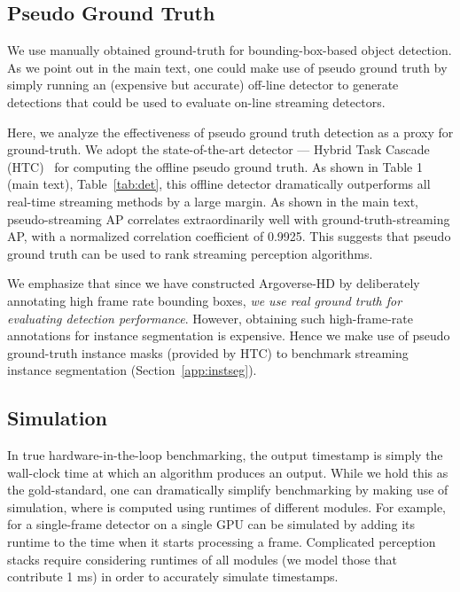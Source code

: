 \subsection{Pseudo Ground Truth}
\label{app:pseudo-gt}
We use manually obtained ground-truth for bounding-box-based object detection. As we point out in the main text, one could make use of pseudo ground truth by simply running an (expensive but accurate) off-line detector to generate detections that could be used to evaluate on-line streaming detectors.

Here, we analyze the effectiveness of pseudo ground truth detection as a proxy for ground-truth.
We adopt the state-of-the-art detector --- Hybrid Task Cascade (HTC)~\cite{chen2019hybrid} for computing the offline pseudo ground truth. As shown in 
\ifstandalonesupplement
    Table 1 (main text),
\else
    Table~\ref{tab:det},
\fi
this offline detector dramatically outperforms all real-time streaming methods by a large margin. As shown in the main text, pseudo-streaming AP correlates extraordinarily well with ground-truth-streaming AP, with a normalized correlation coefficient of 0.9925. This suggests that pseudo ground truth can be used to rank streaming perception algorithms. 

We emphasize that since we have constructed Argoverse-HD by deliberately annotating high frame rate  bounding boxes, {\em we use real ground truth for evaluating detection performance}. However, obtaining such high-frame-rate annotations for instance segmentation is expensive. Hence we make use of pseudo ground-truth instance masks (provided by HTC) to benchmark streaming instance segmentation (Section~\ref{app:instseg}).



\subsection{Simulation}
\label{app:simulation}



In true hardware-in-the-loop benchmarking, the output timestamp  is simply the wall-clock time at which an algorithm produces an output. While we hold this as the gold-standard, one can dramatically simplify benchmarking by making use of simulation, where  is computed using runtimes of different modules. For example,  for a single-frame detector on a single GPU can be simulated by adding its runtime to the time when it starts processing a frame. Complicated perception stacks require considering runtimes of all modules (we model those that contribute  1 ms) in order to accurately simulate timestamps.

